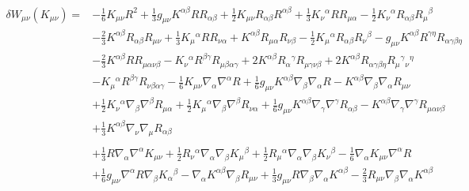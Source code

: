 \documentclass[10pt,letterpaper]{article}
\begin{document}
 \begin{align}
\delta W_{\mu\nu}(K_{\mu\nu})={}&- \tfrac{1}{6} K_{\mu \nu} R^2
 + \tfrac{1}{3} g_{\mu \nu} K^{\alpha \beta} R R_{\alpha \beta}
 + \tfrac{1}{2} K_{\mu \nu} R_{\alpha \beta} R^{\alpha \beta}
 + \tfrac{1}{3} K_{\nu}{}^{\alpha} R R_{\mu \alpha}
 -  \tfrac{1}{2} K_{\nu}{}^{\alpha} R_{\alpha \beta} R_{\mu}{}^{\beta}\nonumber\\
& -  \tfrac{2}{3} K^{\alpha \beta} R_{\alpha \beta} R_{\mu \nu}
 + \tfrac{1}{3} K_{\mu}{}^{\alpha} R R_{\nu \alpha}
 + K^{\alpha \beta} R_{\mu \alpha} R_{\nu \beta}
 -  \tfrac{1}{2} K_{\mu}{}^{\alpha} R_{\alpha \beta} R_{\nu}{}^{\beta}
 -  g_{\mu \nu} K^{\alpha \beta} R^{\gamma \eta} R_{\alpha \gamma \beta \eta}\nonumber\\
& -  \tfrac{2}{3} K^{\alpha \beta} R R_{\mu \alpha \nu \beta}
 -  K_{\nu}{}^{\alpha} R^{\beta \gamma} R_{\mu \beta \alpha \gamma}
 + 2 K^{\alpha \beta} R_{\alpha}{}^{\gamma} R_{\mu \gamma \nu \beta}
 + 2 K^{\alpha \beta} R_{\alpha \gamma \beta \eta} R_{\mu}{}^{\gamma}{}_{\nu}{}^{\eta}\nonumber\\
& -  K_{\mu}{}^{\alpha} R^{\beta \gamma} R_{\nu \beta \alpha \gamma}
 -  \tfrac{1}{6} K_{\mu \nu} \nabla_{\alpha}\nabla^{\alpha}R
 + \tfrac{1}{6} g_{\mu \nu} K^{\alpha \beta} \nabla_{\beta}\nabla_{\alpha}R
 -  K^{\alpha \beta} \nabla_{\beta}\nabla_{\alpha}R_{\mu \nu}\nonumber\\
& + \tfrac{1}{2} K_{\nu}{}^{\alpha} \nabla_{\beta}\nabla^{\beta}R_{\mu \alpha}
 + \tfrac{1}{2} K_{\mu}{}^{\alpha} \nabla_{\beta}\nabla^{\beta}R_{\nu \alpha}
 + \tfrac{1}{6} g_{\mu \nu} K^{\alpha \beta} \nabla_{\gamma}\nabla^{\gamma}R_{\alpha \beta}
 -  K^{\alpha \beta} \nabla_{\gamma}\nabla^{\gamma}R_{\mu \alpha \nu \beta}\nonumber\\
& + \tfrac{1}{3} K^{\alpha \beta} \nabla_{\nu}\nabla_{\mu}R_{\alpha \beta}\nonumber
\\ \nonumber \\
&+\tfrac{1}{3} R \nabla_{\alpha}\nabla^{\alpha}K_{\mu \nu}
 + \tfrac{1}{2} R_{\nu}{}^{\alpha} \nabla_{\alpha}\nabla_{\beta}K_{\mu}{}^{\beta}
 + \tfrac{1}{2} R_{\mu}{}^{\alpha} \nabla_{\alpha}\nabla_{\beta}K_{\nu}{}^{\beta}
 -  \tfrac{1}{6} \nabla_{\alpha}K_{\mu \nu} \nabla^{\alpha}R\nonumber\\
& + \tfrac{1}{6} g_{\mu \nu} \nabla^{\alpha}R \nabla_{\beta}K_{\alpha}{}^{\beta}
 -  \nabla_{\alpha}K^{\alpha \beta} \nabla_{\beta}R_{\mu \nu}
 + \tfrac{1}{3} g_{\mu \nu} R \nabla_{\beta}\nabla_{\alpha}K^{\alpha \beta}
 -  \tfrac{2}{3} R_{\mu \nu} \nabla_{\beta}\nabla_{\alpha}K^{\alpha \beta}\nonumber\\

\end{align}
\end{document}
